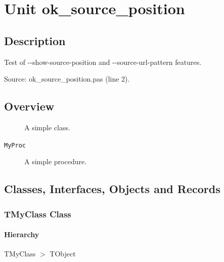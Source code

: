 \documentclass{report}
\newif\ifpdf
\begin{document}
\label{toc}\tableofcontents
\newpage
\newlength{\tmplength}
\chapter{Unit ok{\_}source{\_}position}
\label{ok_source_position}
\section{Description}
Test of {-}{-}show{-}source{-}position and {-}{-}source{-}url{-}pattern features.\par
Source: ok{\_}source{\_}position.pas (line 2).
\section{Overview}
\begin{description}
\item[\texttt{\begin{ttfamily}TMyClass\end{ttfamily} Class}]A simple class.
\end{description}
\begin{description}
\item[\texttt{MyProc}]A simple procedure.
\end{description}
\section{Classes, Interfaces, Objects and Records}
\ifpdf
\subsection*{\large{\textbf{TMyClass Class}}\normalsize\hspace{1ex}\hrulefill}
\else
\subsection*{TMyClass Class}
\fi
\label{ok_source_position.TMyClass}
\subsubsection*{\large{\textbf{Hierarchy}}\normalsize\hspace{1ex}\hfill}
TMyClass {$>$} TObject
\end{document}
